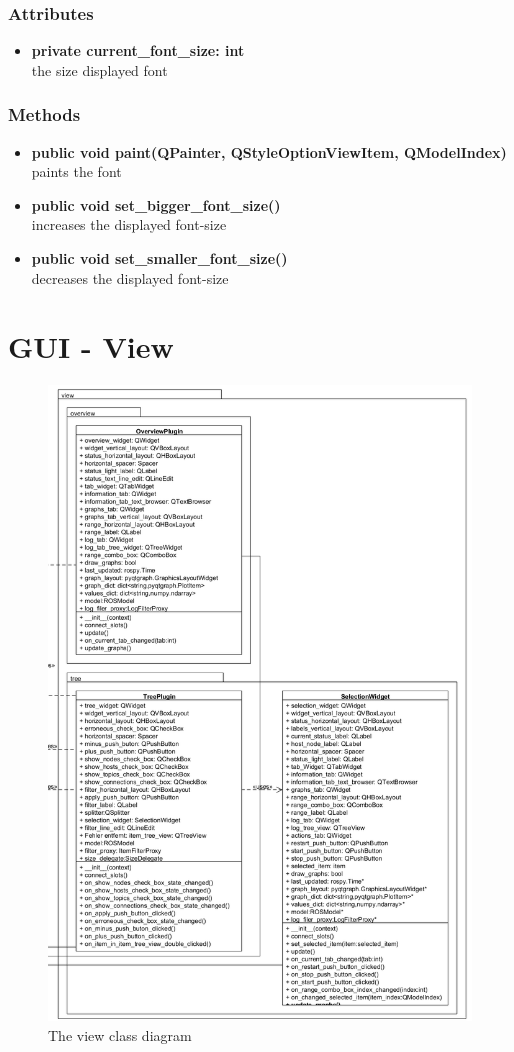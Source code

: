 \subsubsection{Attributes}
\begin{itemize}
  \item \textbf{private current\_font\_size: int}\\
  the size displayed font
\end{itemize}
\subsubsection{Methods}
\begin{itemize}
  \item \textbf{public void paint(QPainter, QStyleOptionViewItem,
  QModelIndex)}\\
  paints the font
  \item \textbf{public void set\_bigger\_font\_size()}\\
  increases the displayed font-size
  \item \textbf{public void set\_smaller\_font\_size()}\\
  decreases the displayed font-size
\end{itemize}

\newpage
\section{GUI - View}
\begin{figure}[!ht]
\begin{center}
\includegraphics[width=0.8\linewidth]{./diagram_pictures/view.png}
\caption{The view class diagram}
\end{center}
\end{figure}

